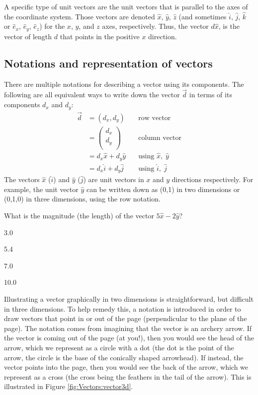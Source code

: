 A specific type of unit vectors are the unit vectors that is parallel to the axes of the coordinate system. Those vectors are denoted $\hat x$, $\hat y$, $\hat z$ (and sometimes $\hat i$, $\hat j$, $\hat k$ or $\hat e_x$, $\hat e_y$, $\hat e_z$) for the $x$, $y$, and $z$ axes, respectively. Thus, the vector $d\hat{x}$, is the vector of length $d$ that points in the positive $x$ direction. 

\subsection{Notations and representation of vectors}
There are multiple notations for describing a vector using its components. The following are all equivalent ways to write down the vector $\vec d$ in terms of its components $d_x$ and $d_y$:
\begin{align*}
\vec d &= (d_x,d_y)\quad&\text{row vector}\\
       &=\begin{pmatrix}
           d_x \\
           d_y \\
         \end{pmatrix}\quad&\text{column vector}\\
         &= d_x\hat x +d_y \hat y\quad&\text{using }\hat x,\;\hat y\\
         &=d_x\hat i +d_y \hat j \quad&\text{using }\hat i,\;\hat j
\end{align*}
The vectors $\hat x$ ($\hat i$) and $\hat y$ ($\hat j$) are unit vectors in $x$ and $y$ directions respectively.
For example, the unit vector $\hat y$ can be written down as (0,1) in two dimensions or (0,1,0) in three dimensions, using the row notation.

\begin{checkpoint}
\begin{MCquestion}{What is the magnitude (the length) of the vector $5\hat x-2\hat y$?}
\item 3.0
\item 5.4 \correct
\item 7.0
\item 10.0
\end{MCquestion}
\end{checkpoint}

Illustrating a vector graphically in two dimensions is straightforward, but difficult in three dimensions. To help remedy this, a notation is introduced in order to draw vectors that point in or out of the page (perpendicular to the plane of the page). The notation comes from imagining that the vector is an archery arrow. If the vector is coming out of the page (at you!), then you would see the head of the arrow, which we represent as a circle with a dot (the dot is the point of the arrow, the circle is the base of the conically shaped arrowhead). If instead, the vector points into the page, then you would see the back of the arrow, which we represent as a cross (the cross being the feathers in the tail of the arrow). This is illustrated in Figure \ref{fig:Vectors:vector3d}.

